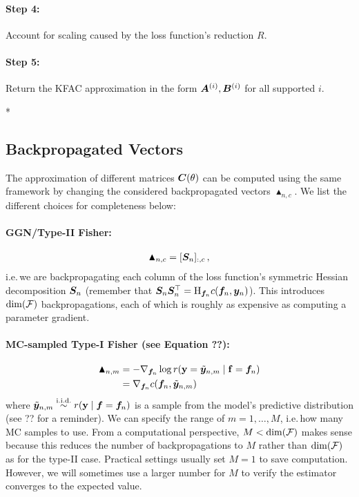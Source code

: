 \paragraph{Step 4:} Account for scaling caused by the loss function's reduction $R$.

\paragraph{Step 5:} Return the KFAC approximation in the form ${\bm{A}}^{(i)}, {\bm{B}}^{(i)}$ for all supported $i$.

\switchcolumn[1]*
\switchcolumn[0]

\subsection{Backpropagated Vectors}
The approximation of different matrices ${\bm{C}}(\theta)$ can be computed using the same framework by changing the considered backpropagated vectors $\blacktriangle_{n,c}$. We list the different choices for completeness below:

\paragraph{GGN/Type-II Fisher: }
\begin{align*}
  \blacktriangle_{n,c} = [{\bm{S}}_n]_{:,c}\,,
\end{align*}
i.e.\,we are backpropagating each column of the loss function's symmetric Hessian decomposition ${\bm{S}}_n$ (remember that ${\bm{S}}_n {\bm{S}}_n^{\top} = \mathrm{H}_{{\bm{f}}_n} c({\bm{f}}_n, {\bm{y}}_n)$).
This introduces $\dim({\mathcal{F}})$ backpropagations, each of which is roughly as expensive as computing a parameter gradient.

\paragraph{MC-sampled Type-I Fisher (see Equation ??): }
\begin{align*}
  \blacktriangle_{n,m}
  &= -\nabla_{{\bm{f}}_n} \log r({\mathbf{y}}=\tilde{{\bm{y}}}_{n,m} \mid {\mathbf{f}} = {\bm{f}}_n)
  \\
  &= \nabla_{{\bm{f}}_n}  c({\bm{f}}_n, \tilde{{\bm{y}}}_{n,m})
\end{align*}
where $\tilde{{\bm{y}}}_{n,m} \stackrel{\text{i.i.d.}}{\sim} r({\mathbf{y}} \mid {\bm{f}} = {\bm{f}}_n)$ is a sample from the model's predictive distribution (see ?? for a reminder).
We can specify the range of $m=1, \dots, M$, i.e.\,how many MC samples to use.
From a computational perspective, $M < \dim({\mathcal{F}})$ makes sense because this reduces the number of backpropagations to $M$ rather than $\dim({\mathcal{F}})$ as for the type-II case.
Practical settings usually set $M=1$ to save computation.
However, we will sometimes use a larger number for $M$ to verify the estimator converges to the expected value.

